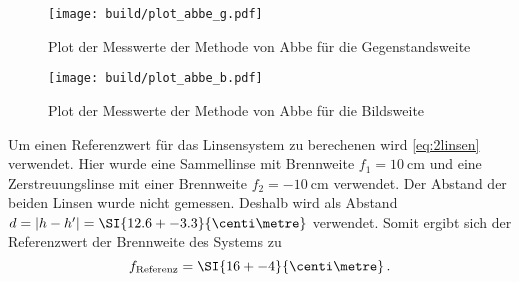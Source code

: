\begin{figure}
    \centering
    \texttt{[image: build/plot\_abbe\_g.pdf]}
    \caption{Plot der Messwerte der Methode von Abbe für die Gegenstandsweite}
    \label{fig:plot_abbe_g}
\end{figure}

\begin{figure}
    \centering
    \texttt{[image: build/plot\_abbe\_b.pdf]}
    \caption{Plot der Messwerte der Methode von Abbe für die Bildsweite}
    \label{fig:plot_abbe_b}
\end{figure}

Um einen Referenzwert für das Linsensystem zu berechenen wird \autoref{eq:2linsen} verwendet.
Hier wurde eine Sammellinse mit Brennweite $f_1 = \SI{10}{\centi\metre}$ und eine Zerstreuungslinse mit einer Brennweite $f_2 = \SI{-10}{\centi\metre}$ verwendet.
Der Abstand der beiden Linsen wurde nicht gemessen.
Deshalb wird als Abstand $d=|h-h'|=\SI{12.6+-3.3}{\centi\metre}$ verwendet.
Somit ergibt sich der Referenzwert der Brennweite des Systems zu
\begin{equation*}
    f_\text{Referenz} = \SI{16+-4}{\centi\metre} \, .
\end{equation*}